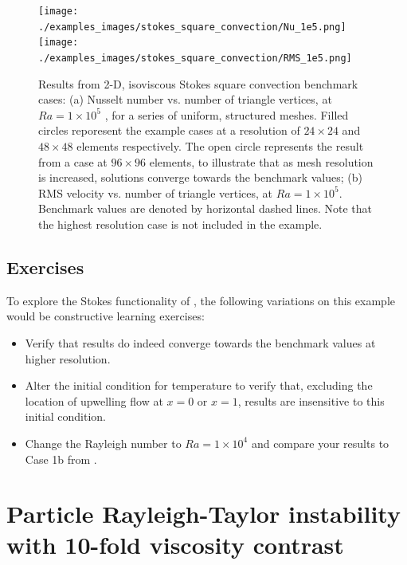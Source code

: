 \begin{figure}[t]
	\centering
	      \texttt{[image: ./examples\_images/stokes\_square\_convection/Nu\_1e5.png]}
	      \texttt{[image: ./examples\_images/stokes\_square\_convection/RMS\_1e5.png]}
   \caption{Results from 2-D, isoviscous Stokes square convection benchmark cases: (a) Nusselt number vs. number of triangle vertices, at $Ra = 1 \times 10^{5}$ \citep[case 1b:][]{blankenbach1989}, for a series of uniform, structured meshes. Filled circles reporesent the example cases at a resolution of $24 \times 24$ and $48 \times 48$ elements respectively. The open circle represents the result from a case at $96 \times 96$ elements, to illustrate that as mesh resolution is increased, solutions converge towards the benchmark values; (b) RMS velocity vs. number of triangle vertices, at $Ra = 1 \times 10^{5}$. Benchmark values are denoted by horizontal dashed lines. Note that the highest resolution case is not included in the example.}
   \label{fig:stokes_square_convection_graphs}
\end{figure}


\subsection{Exercises}
To explore the Stokes functionality of \fluidity, the following variations on this example would be constructive learning exercises:
\begin{itemize}
\item Verify that results do indeed converge towards the benchmark values at higher resolution.
\item Alter the initial condition for temperature to verify that, excluding the location of upwelling flow at $x=0$ or $x=1$, results are insensitive to this initial condition. 
\item Change the Rayleigh number to $Ra = 1 \times 10^{4}$ and compare your results to Case 1b from \citet{blankenbach1989}.
\end{itemize}



\section{Particle Rayleigh-Taylor instability with 10-fold viscosity contrast}
\label{sec:particle_rayleigh_taylor_mu10}

